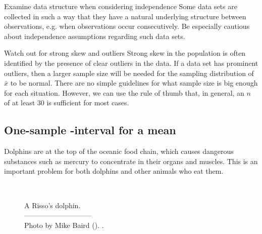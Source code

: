 \begin{onebox}{Examine data structure when considering independence}
{Some data sets are collected in such a way that they have a natural underlying structure between observations, e.g. when observations occur consecutively. Be especially cautious about independence assumptions regarding such data sets.}
\end{onebox}

\begin{onebox}{Watch out for strong skew and outliers}
{Strong skew in the population is often identified by the presence of clear outliers in the data. If a data set has prominent outliers, then a larger sample size will be needed for the sampling distribution of $\bar{x}$ to be normal. There are no simple guidelines for what sample size is big enough for each situation. However, we can use the rule of thumb that, in general, an $n$ of at least 30 is sufficient for most cases.}
\end{onebox}


\subsection[One-sample $t$-interval for a mean]{One-sample -interval for a mean}
\label{oneSampleTConfidenceIntervals}


Dolphins are at the top of the oceanic food chain, which causes dangerous substances such as mercury to concentrate in their organs and muscles. This is an important problem for both dolphins and other animals who eat them.
\captionsetup{width=86mm}

\begin{figure}[h]
\centering
{}  \\
\addvspace{2mm}
\begin{minipage}{\textwidth}
   \caption[rissosDolphinPic]{A Risso's dolphin.\vspace{-1mm} \\
   -----------------------------\vspace{-2mm}\\
   {\footnotesize Photo by Mike Baird (). .\vspace{-10mm}}}
   \label{rissosDolphin}
\end{minipage}
\vspace{3mm}
\end{figure}
\captionsetup{width=\mycaptionwidth}

